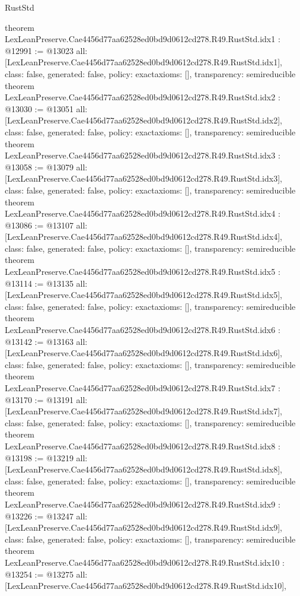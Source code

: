 \begin{lexlean}{RustStd}
\begin{coremodule}
{}
theorem LexLeanPreserve.Cae4456d77aa62528ed0bd9d0612cd278.R49.RustStd.idx1 : @12991 := @13023 {
  all: [LexLeanPreserve.Cae4456d77aa62528ed0bd9d0612cd278.R49.RustStd.idx1],
  class: false,
  generated: false,
  policy: exact{axioms: []},
  transparency: semireducible
}
theorem LexLeanPreserve.Cae4456d77aa62528ed0bd9d0612cd278.R49.RustStd.idx2 : @13030 := @13051 {
  all: [LexLeanPreserve.Cae4456d77aa62528ed0bd9d0612cd278.R49.RustStd.idx2],
  class: false,
  generated: false,
  policy: exact{axioms: []},
  transparency: semireducible
}
theorem LexLeanPreserve.Cae4456d77aa62528ed0bd9d0612cd278.R49.RustStd.idx3 : @13058 := @13079 {
  all: [LexLeanPreserve.Cae4456d77aa62528ed0bd9d0612cd278.R49.RustStd.idx3],
  class: false,
  generated: false,
  policy: exact{axioms: []},
  transparency: semireducible
}
theorem LexLeanPreserve.Cae4456d77aa62528ed0bd9d0612cd278.R49.RustStd.idx4 : @13086 := @13107 {
  all: [LexLeanPreserve.Cae4456d77aa62528ed0bd9d0612cd278.R49.RustStd.idx4],
  class: false,
  generated: false,
  policy: exact{axioms: []},
  transparency: semireducible
}
theorem LexLeanPreserve.Cae4456d77aa62528ed0bd9d0612cd278.R49.RustStd.idx5 : @13114 := @13135 {
  all: [LexLeanPreserve.Cae4456d77aa62528ed0bd9d0612cd278.R49.RustStd.idx5],
  class: false,
  generated: false,
  policy: exact{axioms: []},
  transparency: semireducible
}
theorem LexLeanPreserve.Cae4456d77aa62528ed0bd9d0612cd278.R49.RustStd.idx6 : @13142 := @13163 {
  all: [LexLeanPreserve.Cae4456d77aa62528ed0bd9d0612cd278.R49.RustStd.idx6],
  class: false,
  generated: false,
  policy: exact{axioms: []},
  transparency: semireducible
}
theorem LexLeanPreserve.Cae4456d77aa62528ed0bd9d0612cd278.R49.RustStd.idx7 : @13170 := @13191 {
  all: [LexLeanPreserve.Cae4456d77aa62528ed0bd9d0612cd278.R49.RustStd.idx7],
  class: false,
  generated: false,
  policy: exact{axioms: []},
  transparency: semireducible
}
theorem LexLeanPreserve.Cae4456d77aa62528ed0bd9d0612cd278.R49.RustStd.idx8 : @13198 := @13219 {
  all: [LexLeanPreserve.Cae4456d77aa62528ed0bd9d0612cd278.R49.RustStd.idx8],
  class: false,
  generated: false,
  policy: exact{axioms: []},
  transparency: semireducible
}
theorem LexLeanPreserve.Cae4456d77aa62528ed0bd9d0612cd278.R49.RustStd.idx9 : @13226 := @13247 {
  all: [LexLeanPreserve.Cae4456d77aa62528ed0bd9d0612cd278.R49.RustStd.idx9],
  class: false,
  generated: false,
  policy: exact{axioms: []},
  transparency: semireducible
}
theorem LexLeanPreserve.Cae4456d77aa62528ed0bd9d0612cd278.R49.RustStd.idx10 : @13254 := @13275 {
  all: [LexLeanPreserve.Cae4456d77aa62528ed0bd9d0612cd278.R49.RustStd.idx10],
}
\end{coremodule}
\end{lexlean}
